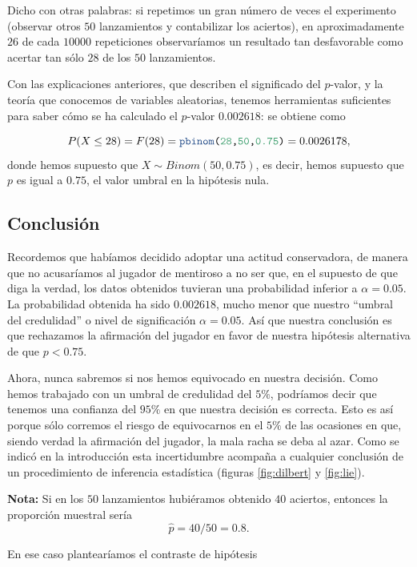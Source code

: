 \documentclass[
  notoc,
  nobib,
  degree=inf]{mnye}
\newcommand{\DecValTok}[1]{\textcolor[rgb]{0.00,0.00,0.81}{#1}}
\newcommand{\KeywordTok}[1]{\textcolor[rgb]{0.13,0.29,0.53}{\textbf{#1}}}
\newcommand{\NormalTok}[1]{#1}
\renewcommand{\DecValTok}[1]{\textcolor[RGB]{64, 160, 112}{\texttt{#1}}}
\renewcommand{\KeywordTok}[1]{\textcolor[rgb]{0.13,0.29,0.53}{\texttt{#1}}}
\renewcommand{\NormalTok}[1]{\texttt{#1}}
\begin{document}
Dicho con otras palabras: si repetimos un gran número de veces el experimento (observar otros \(50\) lanzamientos y contabilizar los aciertos), en aproximadamente \(26\) de cada \(10000\) repeticiones observaríamos un resultado tan desfavorable como acertar tan sólo \(28\) de los \(50\) lanzamientos.

Con las explicaciones anteriores, que describen el significado del \(p\)-valor, y la teoría que conocemos de variables aleatorias, tenemos herramientas suficientes para saber cómo se ha calculado el \(p\)-valor \(0.002618\): se obtiene como

\[
    P(X\le 28) = F(28) = \KeywordTok{pbinom}\NormalTok{(}\DecValTok{28}\NormalTok{,}\DecValTok{50}\NormalTok{,}\DecValTok{0.75}\NormalTok{)} =0.0026178,
\]
donde hemos supuesto que \(X\sim Binom(50,0.75)\), es decir, hemos supuesto que \(p\) es igual a \(0.75\), el valor umbral en la hipótesis nula.

\hypertarget{conclusiuxf3n}{%
\subsection{Conclusión}\label{conclusiuxf3n}}

Recordemos que habíamos decidido adoptar una actitud conservadora, de manera que no acusaríamos al jugador de mentiroso a no ser que, en el supuesto de que diga la verdad, los datos obtenidos tuvieran una probabilidad inferior a \(\alpha=0.05\). La probabilidad obtenida ha sido \(0.002618\), mucho menor que nuestro ``umbral del credulidad'' o nivel de significación \(\alpha=0.05\). Así que nuestra conclusión es que rechazamos la afirmación del jugador en favor de nuestra hipótesis alternativa de que \(p<0.75\).

Ahora, nunca sabremos si nos hemos equivocado en nuestra decisión. Como hemos trabajado con un umbral de credulidad del \(5\%\), podríamos decir que tenemos una confianza del \(95\%\) en que nuestra decisión es correcta. Esto es así porque sólo corremos el riesgo de equivocarnos en el \(5\%\) de las ocasiones en que, siendo verdad la afirmación del jugador, la mala racha se deba al azar. Como se indicó en la introducción esta incertidumbre acompaña a cualquier conclusión de un procedimiento de inferencia estadística (figuras \ref{fig:dilbert} y \ref{fig:lie}).

\textbf{Nota:} Si en los \(50\) lanzamientos hubiéramos obtenido \(40\) aciertos, entonces la proporción muestral sería
\[\hat p = 40/50=0.8.\]

En ese caso plantearíamos el contraste de hipótesis
\end{document}
